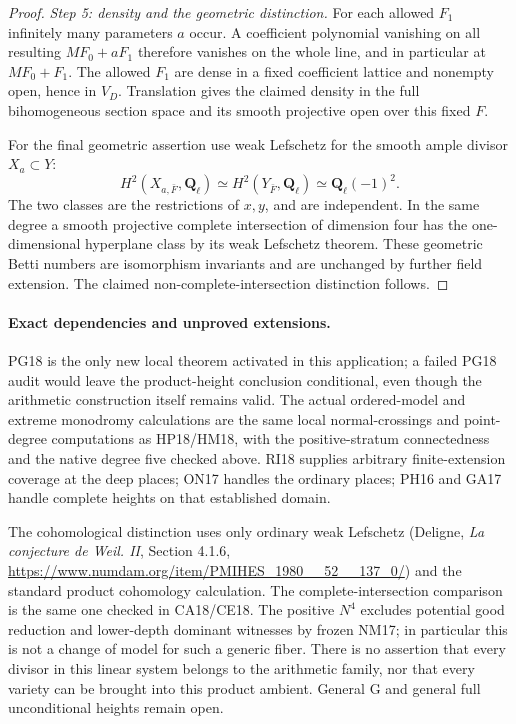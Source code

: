 \begin{proof}
\emph{Step 5: density and the geometric distinction.}
For each allowed $F_1$ infinitely many
parameters $a$ occur.  A coefficient
polynomial vanishing on all resulting
$MF_0+aF_1$ therefore vanishes on the
whole line, and in particular at
$MF_0+F_1$.  The allowed $F_1$ are
dense in a fixed coefficient lattice
and nonempty open, hence in $V_D$.
Translation gives the claimed density
in the full bihomogeneous section space
and its smooth projective open over
this fixed $F$.

For the final geometric assertion use
weak Lefschetz for the smooth ample
divisor $X_a\subset Y$:
\[
 H^2(X_{a,\bar F},\mathbf Q_\ell)
       \simeq H^2(Y_{\bar F},\mathbf Q_\ell)
       \simeq\mathbf Q_\ell(-1)^2.
 \tag{PA18.12}\label{r18pa:b2}
\]
The two classes are the restrictions of
$x,y$, and are independent.  In the
same degree a smooth projective complete
intersection of dimension four has
the one-dimensional hyperplane class
by its weak Lefschetz theorem.  These
geometric Betti numbers are isomorphism
invariants and are unchanged by further
field extension.  The claimed
non-complete-intersection distinction
follows.
\end{proof}

\paragraph{Exact dependencies and unproved extensions.}
PG18 is the only new local theorem activated in
this application; a failed PG18 audit would leave
the product-height conclusion conditional, even
though the arithmetic construction itself remains
valid.  The actual ordered-model and extreme
monodromy calculations are the same local
normal-crossings and point-degree computations
as HP18/HM18, with the positive-stratum
connectedness and the native degree five checked
above.  RI18 supplies arbitrary finite-extension
coverage at the deep places; ON17 handles the
ordinary places; PH16 and GA17 handle complete
heights on that established domain.

The cohomological distinction uses only ordinary
weak Lefschetz (Deligne, \emph{La conjecture de
Weil. II}, Section 4.1.6,
\url{https://www.numdam.org/item/PMIHES_1980__52__137_0/})
and the standard product cohomology calculation.
The complete-intersection comparison is the
same one checked in CA18/CE18.
The positive $N^4$ excludes potential good
reduction and lower-depth dominant witnesses
by frozen NM17; in particular this is not
a change of model for such a generic fiber.
There is no assertion that every divisor in
this linear system belongs to the arithmetic
family, nor that every variety can be brought
into this product ambient.  General G and
general full unconditional heights remain open.
